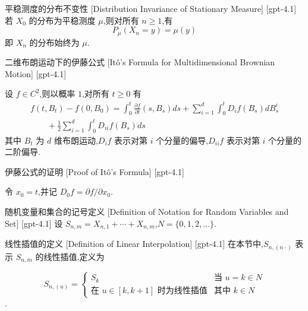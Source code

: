\documentclass[UTF8]{ctexart}
\begin{document}
    \begin{ppt}
        {平稳测度的分布不变性}
        [Distribution Invariance of Stationary Measure]
        [gpt-4.1]
        若 $X_0$ 的分布为平稳测度 $\mu$,则对所有 $n \geq 1$,有
\[
P_{\mu}(X_n = y) = \mu(y)
\]
即 $X_n$ 的分布始终为 $\mu$.
    \end{ppt}
    
    
    
    \begin{thm}
        {二维布朗运动下的伊藤公式}
        [Itô's Formula for Multidimensional Brownian Motion]
        [gpt-4.1]
        
设 $f \in C^{2}$,则以概率 $1$,对所有 $t \geq 0$ 有
\[
\begin{array}{l}
{
f(t, B_{t}) - f(0, B_{0}) = \displaystyle \int_{0}^{t} \frac{\partial f}{\partial t}(s, B_{s}) ds
+ \sum_{i=1}^{d} \int_{0}^{t} D_{i} f(B_{s}) dB_{s}^{i}
} \\
{
\displaystyle \qquad + \frac{1}{2} \sum_{i=1}^{d} \int_{0}^{t} D_{ii} f(B_{s}) ds
}
\end{array}
\]
其中 $B_t$ 为 $d$ 维布朗运动,$D_i f$ 表示对第 $i$ 个分量的偏导,$D_{ii} f$ 表示对第 $i$ 个分量的二阶偏导.

    \end{thm}
    
    
    
    \begin{prf}
        {伊藤公式的证明}
        [Proof of Itô's Formula]
        [gpt-4.1]
        
令 $x_{0} = t$,并记 $D_{0} f = \partial f / \partial x_{0}$.

    \end{prf}
    
    
    
    \begin{dfn}
        {随机变量和集合的记号定义}
        [Definition of Notation for Random Variables and Set]
        [gpt-4.1]
        设 $S_{n,m} = X_{n,1} + \cdots + X_{n,m}$,$N = \{ 0, 1, 2, \ldots \}$.
    \end{dfn}
    
    
    
    \begin{dfn}
        {线性插值的定义}
        [Definition of Linear Interpolation]
        [gpt-4.1]
        在本节中,$S_{n,(n \cdot)}$ 表示 $S_{n,m}$ 的线性插值,定义为

\[
S_{n,(u)} = 
\begin{cases}
S_{k} & \text{当 } u = k \in N \\
\text{在 } u \in [ k, k + 1 ] \text{ 时为线性插值} & \text{其中 } k \in N
\end{cases}
\]
.
    \end{dfn}
    
\end{document}
